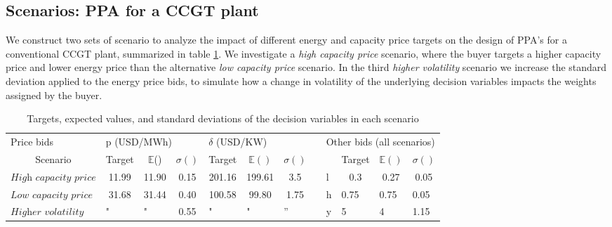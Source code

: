\documentclass[informs]{informs3}
\begin{document}
\subsection{Scenarios: PPA for a CCGT plant }\label{subsection_ScenarioDesign}

We construct two sets of scenario to analyze the impact of different energy and capacity price targets on the design of PPA's for a conventional CCGT plant,  summarized in table \ref{tableScenarios}. We investigate a \textit{high capacity price} scenario, where the buyer targets a higher capacity price and lower energy price than the alternative \textit{low capacity price} scenario. In the third \textit{higher volatility} scenario we increase the standard deviation applied to the energy price bids, to simulate how a change in volatility of the underlying decision variables impacts the weights assigned by the buyer.


\begin{table}%
\caption {Targets, expected values, and standard deviations of the decision variables in each scenario } \label{tableScenarios}
\begin{tabular}{@{}lcccccclllll@{}}
\cmidrule(r){1-7} \cmidrule(l){9-12}
Price bids                     & \multicolumn{3}{l}{p (USD/MWh)}                            & \multicolumn{3}{l}{$\delta$ (USD/KW)}                                  &  & \multicolumn{4}{l}{Other bids (all scenarios)}                                                       \\ \cmidrule(r){1-7} \cmidrule(l){9-12} 
\multicolumn{1}{c}{Scenario}   & Target                & $\mathbb{E}$()        & $\sigma()$ & Target                & $\mathbb{E}()$        & $\sigma()$             &  &   & \multicolumn{1}{c}{Target} & \multicolumn{1}{c}{$\mathbb{E}()$} & \multicolumn{1}{c}{$\sigma()$} \\
$\textit{High capacity price}$ & 11.99                 & 11.90                 & 0.15       & 201.16                & 199.61                & 3.5                  &  & l & \multicolumn{1}{c}{0.3}    & \multicolumn{1}{c}{0.27}           & \multicolumn{1}{c}{0.05}       \\
$\textit{Low capacity price}$  & 31.68                & 31.44                & 0.40       & 100.58               & 99.80                & 1.75                &  & h & 0.75                       & 0.75                               & 0.05                           \\
$\textit{Higher volatility}$  & \multicolumn{1}{l}{"} & \multicolumn{1}{l}{"} & 0.55       & \multicolumn{1}{l}{"} & \multicolumn{1}{l}{"} & \multicolumn{1}{l}{''} &  & y & 5                          & 4                                  & 1.15                           \\ \cmidrule(r){1-7} \cmidrule(l){9-12} 
\end{tabular}
\end{table}
\end{document}

